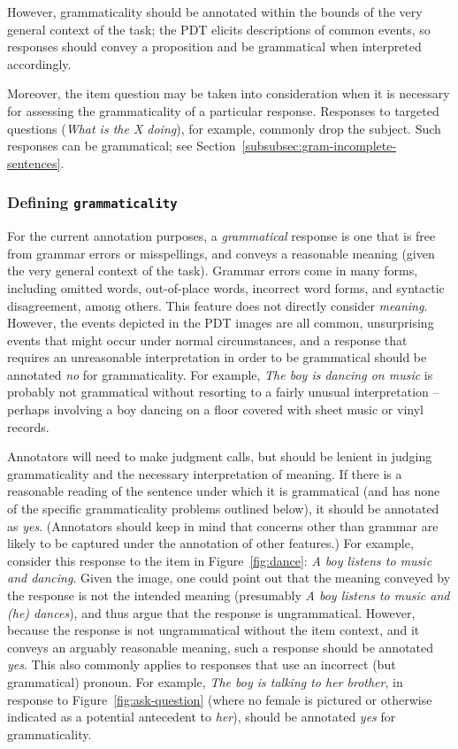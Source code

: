 \documentclass[12pt,notitlepage]{article}
\newcommand{\feat}[1]{\texttt{#1}}
\begin{document}
However, grammaticality should be annotated within the bounds of the very general context of the task; the PDT elicits descriptions of common events, so responses should convey a proposition and be grammatical when interpreted accordingly.

Moreover, the item question may be taken into consideration when it is necessary for assessing the grammaticality of a particular response. Responses to targeted questions (\textit{What is the X doing}), for example, commonly drop the subject. Such responses can be grammatical; see Section~\ref{subsubsec:gram-incomplete-sentences}.

\subsubsection{Defining \feat{grammaticality}} For the current annotation purposes, a \textit{grammatical} response is one that is free from grammar errors or misspellings, and conveys a reasonable meaning (given the very general context of the task). Grammar errors come in many forms, including omitted words, out-of-place words, incorrect word forms, and syntactic disagreement, among others. This feature does not directly consider \textit{meaning}. However, the events depicted in the PDT images are all common, unsurprising events that might occur under normal circumstances, and a response that requires an unreasonable interpretation in order to be grammatical should be annotated \textit{no} for grammaticality. For example, \textit{The boy is dancing on music} is probably not grammatical without resorting to a fairly unusual interpretation -- perhaps involving a boy dancing on a floor covered with sheet music or vinyl records.

Annotators will need to make judgment calls, but should be lenient in judging grammaticality and the necessary interpretation of meaning. If there is a reasonable reading of the sentence under which it is grammatical (and has none of the specific grammaticality problems outlined below), it should be annotated as \textit{yes}. (Annotators should keep in mind that concerns other than grammar are likely to be captured under the annotation of other features.) For example, consider this response to the item in Figure~\ref{fig:dance}: \textit{A boy listens to music and dancing}. Given the image, one could point out that the meaning conveyed by the response is not the intended meaning (presumably \textit{A boy listens to music and (he) dances}), and thus argue that the response is ungrammatical. However, because the response is not ungrammatical without the item context, and it conveys an arguably reasonable meaning, such a response should be annotated \textit{yes}. This also commonly applies to responses that use an incorrect (but grammatical) pronoun. For example, \textit{The boy is talking to her brother}, in response to Figure~\ref{fig:ask-question} (where no female is pictured or otherwise indicated as a potential antecedent to \textit{her}), should be annotated \textit{yes} for grammaticality.
\end{document}
